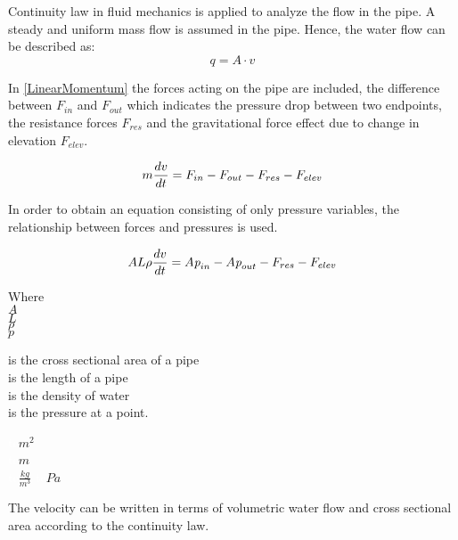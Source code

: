 Continuity law in fluid mechanics is applied to analyze the flow in the pipe\cite{Hunt_Fluidmechanics}. A steady and uniform mass flow is assumed in the pipe. Hence, the water flow can be described as: 
\begin{equation}
  q=A \cdot v
	\label{EquationOfContinuity}
\end{equation}

 In \eqref{LinearMomentum} the forces acting on the pipe are included, the difference between $F_{in}$ and $F_{out}$ which indicates the pressure drop 
 between two endpoints, the resistance forces $F_{res}$ and the gravitational force effect due to change in elevation $F_{elev}$.

\begin{equation}
  m \frac{dv}{dt} = F_{in} - F_{out} - F_{res} - F_{elev} \\
  \label{LinearMomentum}
\end{equation}

In order to obtain an equation consisting of only pressure variables, the relationship between forces and pressures is used.


 \begin{equation}
    A L \rho \frac{dv}{dt} = A \textit{p}_{in} - A \textit{p}_{out} - F_{res} - F_{elev} \\
\end{equation}

\begin{minipage}[t]{0.20\textwidth}
Where\\
\hspace*{8mm} $A$ \\
\hspace*{8mm} $L$ \\
\hspace*{8mm} $\rho$\\
\hspace*{8mm} $p$ 
\end{minipage}
\begin{minipage}[t]{0.68\textwidth}
\vspace*{2mm}
is the cross sectional area of a pipe\\
is the length of a pipe\\
is the density of water\\
is the pressure at a point.
\end{minipage}
\begin{minipage}[t]{0.10\textwidth}
\vspace*{2mm}
\textcolor{White}{te}$\unit{m^2}$\\
\textcolor{White}{te}$\unit{m}$\\
\textcolor{White}{te}$\unit{\frac{kg}{m^{3}}}$
\textcolor{White}{te}$\unit{Pa}$\\
\end{minipage}
%
The velocity can be written in terms of volumetric water flow and cross sectional area according to the continuity law.

